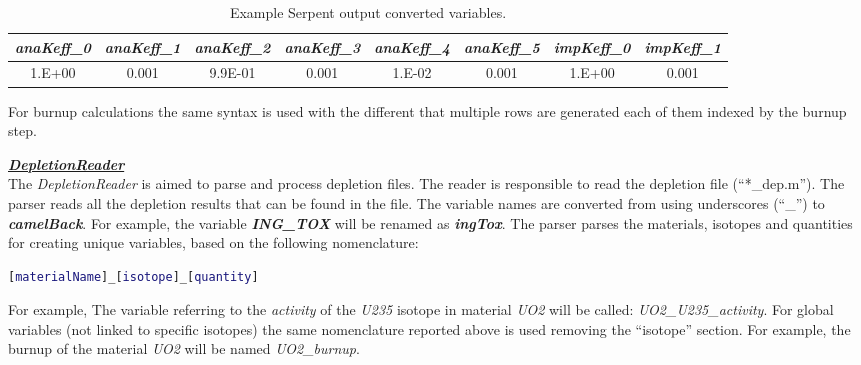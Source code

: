 \begin{table}[ht]
\caption{Example Serpent output converted variables.}
\label{tab:serpentResultConverted}
\begin{tabular}{|c|c|c|c|c|c|c|c|}
\hline
\textit{anaKeff\_0} & \textit{anaKeff\_1} & \textit{anaKeff\_2} & \textit{anaKeff\_3} & \textit{anaKeff\_4} & \textit{anaKeff\_5} & \textit{impKeff\_0} & \textit{impKeff\_1} \\ \hline
1.E+00              & 0.001               & 9.9E-01             & 0.001               & 1.E-02              & 0.001               & 1.E+00              & 0.001               \\ \hline
\end{tabular}
\end{table}

For burnup calculations the same syntax is used with the different that multiple rows are generated each of them indexed by the burnup step.

\textit{\textbf{\underline{DepletionReader}}}
\\The \textit{DepletionReader} is aimed to parse and process depletion files.
The reader is responsible to read the depletion file (``*\_dep.m'').
The parser reads all the depletion results that can
be found in the file.
The variable names are converted from using underscores (``\_'') to \textit{\textbf{camelBack}}. For example,
the variable \textit{\textbf{ING\_TOX}} will be renamed
 as \textit{\textbf{ingTox}}.
 The parser parses the materials, isotopes and quantities for creating unique variables, based on the following nomenclature:
  \begin{lstlisting}[language={matlab}]
   [materialName]_[isotope]_[quantity]
\end{lstlisting}
For example, The variable referring to the  \textit{activity}  of the  \textit{U235}  isotope in material  \textit{UO2} will be called:
\textit{UO2\_U235\_activity}.
For global variables (not linked to specific isotopes) the same nomenclature reported above is used removing the ``isotope'' section.
For example, the burnup of the material \textit{UO2} will be named \textit{UO2\_burnup}.

